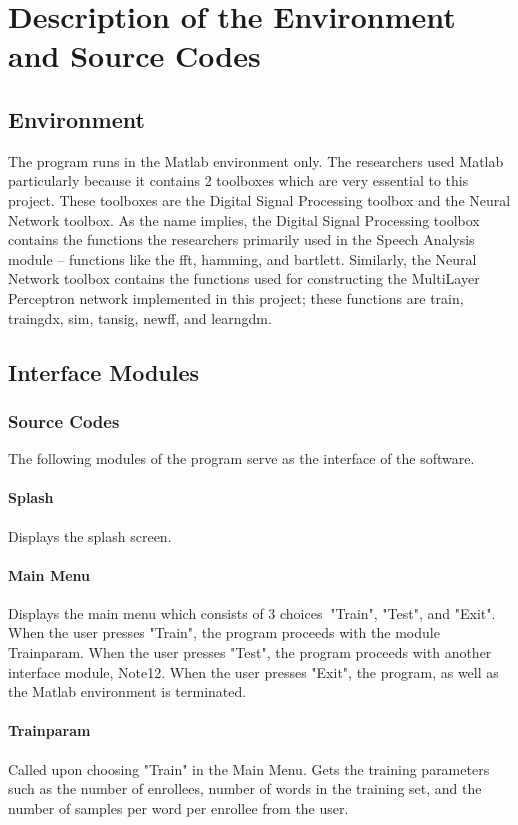 \appendix

\chapter{Description of the Environment and Source Codes}

\section{Environment}
The program runs in the Matlab environment only. The researchers
used Matlab particularly because it contains 2 toolboxes which are
very essential to this project. These toolboxes are the Digital
Signal Processing toolbox and the Neural Network toolbox. As the
name implies, the Digital Signal Processing toolbox contains the
functions the researchers primarily used in the Speech Analysis
module -- functions like the fft, hamming, and bartlett.
Similarly, the Neural Network toolbox contains the functions used
for constructing the MultiLayer Perceptron network implemented in
this project; these functions are train, traingdx, sim, tansig,
newff, and learngdm.


\section{Interface Modules}
\subsection{Source Codes}
The following modules of the program serve as the interface of the
software.

\subsubsection{Splash}
Displays the splash screen.

\subsubsection{Main Menu}
Displays the main menu which consists of 3 choices$\:$ "Train",
"Test", and "Exit". When the user presses "Train", the program
proceeds with the module Trainparam. When the user presses "Test",
the program proceeds with another interface module, Note12. When
the user presses "Exit", the program, as well as the Matlab
environment is terminated.

\subsubsection{Trainparam}
Called upon choosing "Train" in the Main Menu. Gets the training
parameters such as the number of enrollees, number of words in the
training set, and the number of samples per word per enrollee from
the user.

